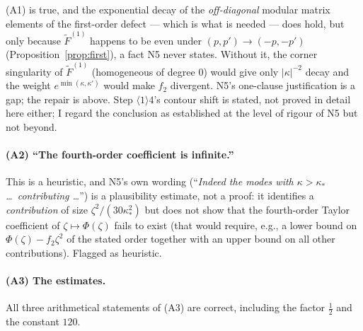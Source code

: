 \documentclass[11pt]{article}
\begin{document}
\begin{verdictgap}
(A1) is true, and the exponential decay of the \emph{off-diagonal} modular matrix elements of the
first-order defect --- which is what is needed --- does hold, but only because
$\widetilde F^{(1)}$ happens to be even under $(p,p')\to(-p,-p')$
(Proposition~\ref{prop:first}), a fact N5 never states.  Without it, the corner singularity of
$\widetilde F^{(1)}$ (homogeneous of degree $0$) would give only $|\kappa|^{-2}$ decay and the
weight $e^{\min(\kappa,\kappa')}$ would make $f_2$ divergent.  N5's one-clause justification is a
gap; the repair is above.  Step $\langle1\rangle4$'s contour shift is stated, not proved in
detail here either; I regard the conclusion as established at the level of rigour of N5 but not
beyond.
\end{verdictgap}

\paragraph{(A2) ``The fourth-order coefficient is infinite.''}
This is a heuristic, and N5's own wording (``\emph{Indeed the modes with $\kappa>\kappa_*$
\dots\ contributing \dots}'') is a plausibility estimate, not a proof: it identifies a
\emph{contribution} of size $\zeta^2/(30\kappa_*^2)$ but does not show that the fourth-order
Taylor coefficient of $\zeta\mapsto\Phi(\zeta)$ fails to exist (that would require, e.g., a lower
bound on $\Phi(\zeta)-f_2\zeta^2$ of the stated order together with an upper bound on all other
contributions).  Flagged as heuristic.

\paragraph{(A3) The estimates.}
\begin{verdictok}All three arithmetical statements of (A3) are correct, including the factor
$\tfrac12$ and the constant $120$.\end{verdictok}
\end{document}
